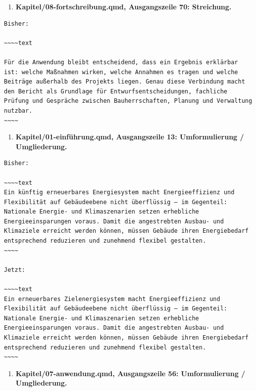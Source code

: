 \documentclass[
  ngerman,
  a4paper,
  DIV=11]{scrreprt}
\providecommand{\tightlist}{%
  \setlength{\itemsep}{0pt}\setlength{\parskip}{0pt}}
\begin{document}
\begin{enumerate}
\def\labelenumi{\arabic{enumi}.}
\setcounter{enumi}{124}
\tightlist
\item
  \textbf{Kapitel/08-fortschreibung.qmd, Ausgangszeile 70: Streichung.}
\end{enumerate}

\begin{verbatim}
Bisher:

~~~~text

Für die Anwendung bleibt entscheidend, dass ein Ergebnis erklärbar ist: welche Maßnahmen wirken, welche Annahmen es tragen und welche Beiträge außerhalb des Projekts liegen. Genau diese Verbindung macht den Bericht als Grundlage für Entwurfsentscheidungen, fachliche Prüfung und Gespräche zwischen Bauherrschaften, Planung und Verwaltung nutzbar.
~~~~
\end{verbatim}

\begin{enumerate}
\def\labelenumi{\arabic{enumi}.}
\setcounter{enumi}{125}
\tightlist
\item
  \textbf{Kapitel/01-einführung.qmd, Ausgangszeile 13: Umformulierung /
  Umgliederung.}
\end{enumerate}

\begin{verbatim}
Bisher:

~~~~text
Ein künftig erneuerbares Energiesystem macht Energieeffizienz und Flexibilität auf Gebäudeebene nicht überflüssig – im Gegenteil: Nationale Energie- und Klimaszenarien setzen erhebliche Energieeinsparungen voraus. Damit die angestrebten Ausbau- und Klimaziele erreicht werden können, müssen Gebäude ihren Energiebedarf entsprechend reduzieren und zunehmend flexibel gestalten.
~~~~

Jetzt:

~~~~text
Ein erneuerbares Zielenergiesystem macht Energieeffizienz und Flexibilität auf Gebäudeebene nicht überflüssig – im Gegenteil: Nationale Energie- und Klimaszenarien setzen erhebliche Energieeinsparungen voraus. Damit die angestrebten Ausbau- und Klimaziele erreicht werden können, müssen Gebäude ihren Energiebedarf entsprechend reduzieren und zunehmend flexibel gestalten.
~~~~
\end{verbatim}

\begin{enumerate}
\def\labelenumi{\arabic{enumi}.}
\setcounter{enumi}{126}
\tightlist
\item
  \textbf{Kapitel/07-anwendung.qmd, Ausgangszeile 56: Umformulierung /
  Umgliederung.}
\end{enumerate}
\end{document}
